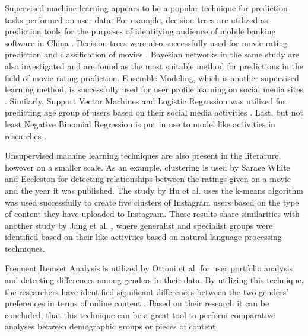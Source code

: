   Supervised machine learning appears to be a popular technique for prediction tasks performed on user data. For example, decision trees are utilized as prediction tools for the purposes of identifying audience of mobile banking software in China \cite{chinesemobilebankingusers}. Decision trees were also successfully used for movie rating prediction \cite{saraee2004data} and classification of movies \cite{kabinsingha2012movie}. Bayesian networks in the same study \cite{kabinsingha2012movie} are also investigated and are found as the most suitable method for predictions in the field of movie rating prediction. Ensemble Modeling, which is another supervised learning method, is successfully used for user profile learning on social media sites \cite{farseev2015harvestingmultiplesources}. Similarly, Support Vector Machines and Logistic Regression was utilized for predicting age group of users based on their social media activities \cite{han2016teensarefrommars}. Last, but not least Negative Binomial Regression is put in use to model like activities in researches \cite{jang2015no, bakhshi2014faces}.

  Unsupervised machine learning techniques are also present in the literature, however on a smaller scale. As an example, clustering is used by Saraee White and Eccleston \cite{saraee2004data} for detecting relationships between the ratings given on a movie and the year it was published. The study by Hu et al. \cite{hu2014we} uses the k-means algorithm was used successfully to create five clusters of Instagram users based on the type of content they have uploaded to Instagram. These results share similarities with another study by Jang et al. \cite{jang2015no}, where generalist and specialist groups were identified based on their like activities based on natural language processing techniques. 

  Frequent Itemset Analysis is utilized by Ottoni et al. \cite{ottoni2013ladies} for user portfolio analysis and detecting differences among genders in their data. By utilizing this technique, the researchers have identified significant differences between the two genders' preferences in terms of online content \cite{ottoni2013ladies}. Based on their research it can be concluded, that this technique can be a great tool to perform comparative analyses between demographic groups or pieces of content. 

